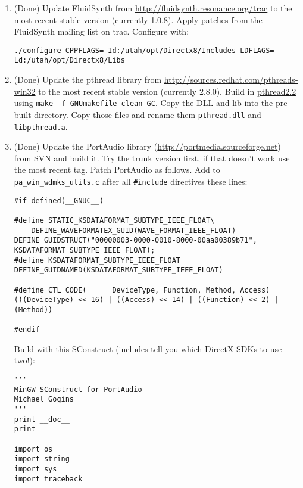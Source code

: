 \documentclass[11pt,letterpaper,onecolumn]{scrartcl}
\begin{document}
\begin{sloppypar}
\begin{enumerate}
\begin{enumerate}
 			\item (Done) Update FluidSynth from \url{http://fluidsynth.resonance.org/trac} to the most recent stable version (currently 1.0.8). Apply patches from the FluidSynth mailing list on trac. Configure with:
    	
\begin{lstlisting}
./configure CPPFLAGS=-Id:/utah/opt/Directx8/Includes LDFLAGS=-Ld:/utah/opt/Directx8/Libs
\end{lstlisting}

   		\item (Done) Update the pthread library from \url{http://sources.redhat.com/pthreads-win32} to the most recent stable version (currently 2.8.0). Build in \url{pthread2.2} using \verb|make -f GNUmakefile clean GC|. Copy the DLL and lib into the pre-built directory. Copy those files and rename them \texttt{pthread.dll} and \texttt{libpthread.a}.
			\item (Done) Update the PortAudio library (\url{http://portmedia.sourceforge.net}) from SVN and build it. Try the trunk version first, if that doesn't work use the most recent tag. Patch PortAudio as follows. Add to \verb|pa_win_wdmks_utils.c| after all \verb|#include| directives these lines:

\begin{lstlisting}
#if defined(__GNUC__)

#define STATIC_KSDATAFORMAT_SUBTYPE_IEEE_FLOAT\
    DEFINE_WAVEFORMATEX_GUID(WAVE_FORMAT_IEEE_FLOAT)
DEFINE_GUIDSTRUCT("00000003-0000-0010-8000-00aa00389b71", KSDATAFORMAT_SUBTYPE_IEEE_FLOAT);
#define KSDATAFORMAT_SUBTYPE_IEEE_FLOAT DEFINE_GUIDNAMED(KSDATAFORMAT_SUBTYPE_IEEE_FLOAT)

#define CTL_CODE(      DeviceType, Function, Method, Access) (((DeviceType) << 16) | ((Access) << 14) | ((Function) << 2) | (Method))

#endif
\end{lstlisting}
			
			Build with this SConstruct (includes tell you which DirectX SDKs to use -- two!):
			
\begin{lstlisting}
'''
MinGW SConstruct for PortAudio
Michael Gogins
'''
print __doc__
print

import os
import string
import sys
import traceback


\end{lstlisting}
\end{enumerate}
\end{enumerate}
\end{sloppypar}
\end{document}
